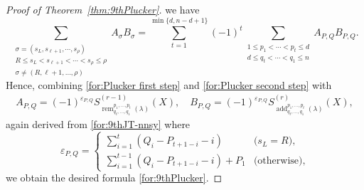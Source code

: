 \documentclass[12pt]{amsart}%
\theoremstyle{definition}
\DeclareMathOperator{\add}{add}
\DeclareMathOperator{\rem}{rem}
\begin{document}
\begin{proof}[Proof of Theorem~\ref{thm:9thPlucker}]
we have 
\begin{equation}
\label{for:Plucker second step}
\sum_{\substack{\sigma=(s_L,s_{\ell+1},\cdots,s_{\rho}) \\
R\le s_L<s_{\ell+1}<\cdots<s_{\rho}\le \rho \\
\sigma \ne (R,\ell+1,\ldots,{\rho})}}
A_{\sigma}B_{\sigma}
=\sum^{\min\{d,n-d+1\}}_{t=1}(-1)^t
\sum_{\substack{
1\le p_1<\cdots<p_t\le d \\
d\le q_t<\cdots<q_1\le n}}A_{P,Q}B_{P,Q}.    
\end{equation}
Hence, combining \eqref{for:Plucker first step} and  
\eqref{for:Plucker second step}
with 
\begin{align*}
A_{P,Q}
=(-1)^{\varepsilon_{P,Q}}
S^{(r-1)}_{\rem^{p_1,\ldots,p_t}_{q_t,\ldots,q_1}(\lambda)}(X),
\quad 
B_{P,Q}
=(-1)^{\varepsilon_{P,Q}}
S^{(r)}_{\add^{p_1,\ldots,p_t}_{q_t,\ldots,q_1}(\lambda)}(X),
\end{align*}
again derived from \eqref{for:9thJT-nnsy} 
where
\[
\varepsilon_{P,Q}
=
\begin{cases}
\sum^{t}_{i=1}(Q_i-P_{t+1-i}-i) & 
\text{($s_L=R$)},\\
\sum^{t-1}_{i=1}(Q_i-P_{t+1-i}-i)+P_1 & \text{(otherwise)},
\end{cases}
\]
we obtain the desired formula \eqref{for:9thPlucker}.



\end{proof}
\end{document}
